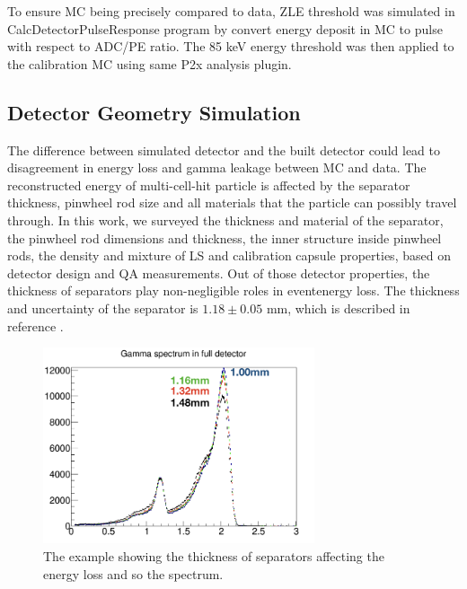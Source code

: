 To ensure MC being precisely compared to data, ZLE threshold was simulated in CalcDetectorPulseResponse program by convert energy deposit in MC to pulse with respect to ADC/PE ratio.
The 85 keV energy threshold was then applied to the calibration MC using same P2x analysis plugin.

\subsection{Detector Geometry Simulation}
The difference between simulated detector and the built detector could lead to disagreement in energy loss and gamma leakage between MC and data. 
The reconstructed energy of multi-cell-hit particle is affected by the separator thickness, pinwheel rod size and all materials that the particle can possibly travel through. 
In this work, we surveyed the thickness and material of the separator, the pinwheel rod dimensions and thickness, the inner structure inside pinwheel rods, the density and mixture of LS and calibration capsule properties, based on detector design and QA measurements.
Out of those detector properties, the thickness of separators play non-negligible roles in eventenergy loss. 
The thickness and uncertainty of the separator is $1.18 \pm 0.05$ mm, which is described in reference \cite{docThick}.

\begin{figure}[h!]
\centering
\includegraphics[width=80mm]{Figures/thickness.png}
\caption{The example showing the thickness of separators affecting the energy loss and so the spectrum.}
\label{fig:thickness}
\end{figure}

